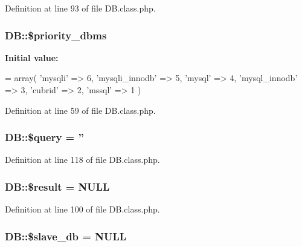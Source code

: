 Definition at line 93 of file D\+B.\+class.\+php.

\hypertarget{classDB_a082292b9ca3855cbddd3a74e9490ca82}{
\subsubsection[{\$priority\+\_\+dbms}]{\setlength{\rightskip}{0pt plus 5cm}D\+B\+::\$priority\+\_\+dbms}}\label{classDB_a082292b9ca3855cbddd3a74e9490ca82}
{\bfseries Initial value\+:}
\begin{DoxyCode}
= array(
        \textcolor{stringliteral}{'mysqli'} => 6,
        \textcolor{stringliteral}{'mysqli\_innodb'} => 5,
        \textcolor{stringliteral}{'mysql'} => 4,
        \textcolor{stringliteral}{'mysql\_innodb'} => 3,
        \textcolor{stringliteral}{'cubrid'} => 2,
        \textcolor{stringliteral}{'mssql'} => 1
    )
\end{DoxyCode}


Definition at line 59 of file D\+B.\+class.\+php.

\hypertarget{classDB_a32ebabea908efd805a83db48fec3ab52}{
\subsubsection[{\$query}]{\setlength{\rightskip}{0pt plus 5cm}D\+B\+::\$query = ''}}\label{classDB_a32ebabea908efd805a83db48fec3ab52}


Definition at line 118 of file D\+B.\+class.\+php.

\hypertarget{classDB_a74e74ee9d3311aa1e8107b8accd05e29}{
\subsubsection[{\$result}]{\setlength{\rightskip}{0pt plus 5cm}D\+B\+::\$result = N\+U\+L\+L}}\label{classDB_a74e74ee9d3311aa1e8107b8accd05e29}


Definition at line 100 of file D\+B.\+class.\+php.

\hypertarget{classDB_a0a811a4446882ee9edf0ed846e8926f3}{
\subsubsection[{\$slave\+\_\+db}]{\setlength{\rightskip}{0pt plus 5cm}D\+B\+::\$slave\+\_\+db = N\+U\+L\+L}}\label{classDB_a0a811a4446882ee9edf0ed846e8926f3}


